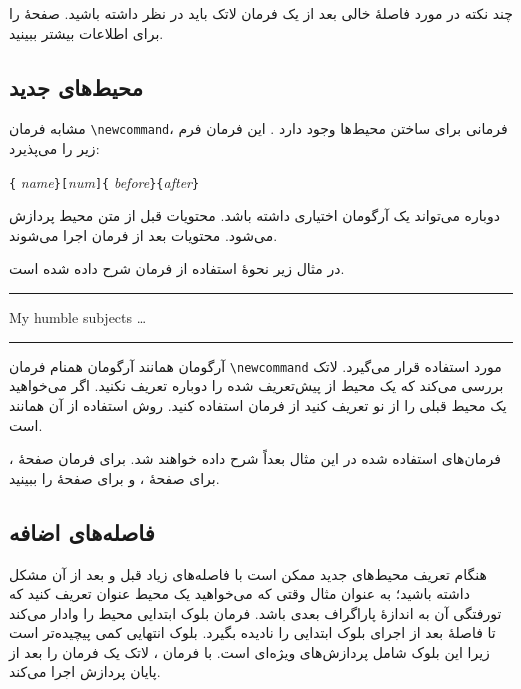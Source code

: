 چند نکته در مورد فاصلهٔ خالی بعد از یک فرمان لاتک باید در نظر داشته باشید. صفحهٔ  
\pageref{whitespace} را برای اطلاعات بیشتر ببینید.
\subsection{محیط‌های جدید}
مشابه فرمان  \verb|\newcommand|، فرمانی برای ساختن محیط‌ها وجود دارد . این فرمان فرم زیر را می‌پذیرد:


\begin{lscommand}
\verb|{|%
       \emph{name}\verb|}[|\emph{num}\verb|]{|%
       \emph{before}\verb|}{|\emph{after}\verb|}|
\end{lscommand}


دوباره  می‌تواند یک آرگومان اختیاری داشته باشد. محتویات  قبل از متن محیط پردازش می‌شود. محتویات  بعد از فرمان 
 اجرا می‌شوند.

در مثال زیر نحوهٔ استفاده از فرمان  شرح داده شده است.
 
\begin{example}
\newenvironment{king}
 {\rule{1ex}{1ex}%
      \hspace{\stretch{1}}}
 {%
      \rule{1ex}{1ex}}

\begin{king} 
My humble subjects \ldots
\end{king}
\end{example}


آرگومان  همانند آرگومان همنام فرمان \verb|\newcommand| مورد استفاده قرار می‌گیرد. لاتک بررسی می‌کند که یک محیط از پیش‌تعریف شده را دوباره تعریف نکنید. اگر می‌خواهید یک محیط قبلی را از نو تعریف کنید از فرمان   استفاده کنید. روش استفاده از آن همانند   است.

فرمان‌های استفاده شده در این مثال بعداً شرح داده خواهند شد.  برای فرمان 
 صفحهٔ \pageref{sec:rule}، برای  صفحهٔ \pageref{cmd:stretch}، و برای  صفحهٔ \pageref{sec:hspace} را ببینید.
\subsection{فاصله‌های اضافه}
هنگام تعریف محیط‌های جدید ممکن است با فاصله‌های زیاد قبل و بعد از آن  مشکل داشته باشید؛ به عنوان مثال وقتی که می‌خواهید یک محیط عنوان تعریف کنید که تورفتگی آن به اندازهٔ پاراگراف بعدی باشد. فرمان  بلوک ابتدایی محیط را وادار می‌کند تا فاصلهٔ بعد از اجرای بلوک ابتدایی را نادیده بگیرد. بلوک انتهایی کمی پیچیده‌تر است زیرا  این بلوک شامل پردازش‌های ویژه‌ای است. با فرمان 
، لاتک یک فرمان  را بعد از پایان پردازش اجرا می‌کند.


